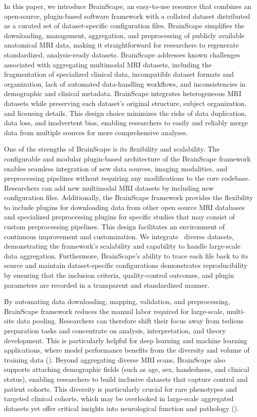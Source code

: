 In this paper, we introduce BrainScape, an easy-to-use resource that combines an open-source, 
plugin-based software framework with a collated dataset distributed as a curated set of 
dataset-specific configuration files.
BrainScape simplifies the downloading, management, aggregation, and preprocessing of publicly available anatomical MRI data, 
making it straightforward for researchers to regenerate standardized, analysis-ready datasets.
BrainScape addresses known challenges associated with aggregating multimodal MRI datasets, 
including the fragmentation of specialized clinical data, incompatible dataset formats and organization, 
lack of automated data-handling workflows, and inconsistencies in demographic and clinical metadata.
BrainScape integrates heterogeneous MRI datasets while preserving each dataset's original structure, 
subject organization, and licensing details.
This design choice minimizes the risks of data duplication, data loss, and inadvertent bias, 
enabling researchers to easily and reliably merge data from multiple sources 
for more comprehensive analyses.

One of the strengths of BrainScape is its flexibility and scalability. 
The configurable and modular plugin-based architecture of the BrainScape framework enables 
seamless integration of new data sources, imaging modalities, and preprocessing pipelines without requiring any modifications to the core codebase.
Researchers can add new multimodal MRI datasets by including new configuration files. 
Additionally, the BrainScape framework provides the flexibility to include plugins for downloading data from other open source MRI databases and  
specialized preprocessing plugins for specific studies that may consist of custom preprocessing pipelines.
This design facilitates an environment of continuous improvement and customization.
We integrate \NumDatasets\ diverse datasets, demonstrating the framework's scalability 
and capability to handle large-scale data aggregation.
Furthermore, BrainScape's ability to trace each file back to its source and maintain 
dataset-specific configurations demonstrates reproducibility by ensuring that the inclusion criteria, 
quality-control outcomes, and plugin parameters are recorded in a transparent and standardized manner.

By automating data downloading, mapping, validation, and preprocessing, BrainScape framework reduces the 
manual labor required for large-scale, multi-site data pooling. Researchers can therefore shift 
their focus away from tedious preparation tasks and concentrate on analysis, interpretation, and theory development. 
This is particularly helpful for deep learning and machine learning applications, where model 
performance benefits from the diversity and volume of training data (\cite{dishner2024survey}). Beyond aggregating diverse MRI scans, 
BrainScape also supports attaching demographic fields (such as age, sex, handedness, and clinical status), enabling 
researchers to build inclusive datasets that capture control and patient cohorts. 
This diversity is particularly crucial for rare phenotypes and targeted clinical cohorts, 
which may be overlooked in large-scale aggregated datasets yet offer critical insights into neurological function and pathology (\cite{thompson2014enigma}).

